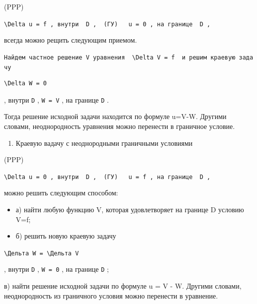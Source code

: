 \documentclass[
  ukrainian,
]{article}
\providecommand{\tightlist}{%
  \setlength{\itemsep}{0pt}\setlength{\parskip}{0pt}}
\begin{document}
(PPP)

\texttt{\textquotesingle{}\textbackslash{}Delta\ u\ =\ f\textquotesingle{}\ ,\ внутри\ \ \textquotesingle{}D\textquotesingle{}\ ,\ \ \textquotesingle{}(ГУ)\textquotesingle{}\ \ \ \textquotesingle{}u\ =\ 0\textquotesingle{}\ ,\ на\ границе\ \ \textquotesingle{}D\textquotesingle{}\ ,}

всегда можно рещить следующим приемом.

\texttt{Найдем\ частное\ решение\ V\ уравнения\ \ \textquotesingle{}\textbackslash{}Delta\ V\ =\ f\textquotesingle{}\ \ и\ решим\ краевую\ задачу}

\begin{verbatim}
\Delta W = 0
\end{verbatim}

, внутри \texttt{D} , \texttt{W\ =\ V} , на границе \texttt{D} .

Тогда решение исходной задачи находится по формуле u=V-W. Другими
словами, неоднородность уравнения можно перенести в граничное условие.

\begin{enumerate}
\def\labelenumi{\arabic{enumi}.}
\setcounter{enumi}{1}
\tightlist
\item
  Краевую вадачу с неоднородными граничными условиями
\end{enumerate}

(PPP)

\texttt{\textquotesingle{}\textbackslash{}Delta\ u\ =\ 0\textquotesingle{}\ ,\ внутри\ \ \textquotesingle{}D\textquotesingle{}\ ,\ \ \textquotesingle{}(ГУ)\textquotesingle{}\ \ \ \textquotesingle{}u\ =\ f\textquotesingle{}\ ,\ на\ границе\ \ \textquotesingle{}D\textquotesingle{}\ ,}

можно решить следующим способом:

\begin{itemize}
\tightlist
\item
  а) найти любую функцию V, которая удовлетворяет на границе D условию
  V=f;
\item
  б) решить новую краевую задачу
\end{itemize}

\texttt{\textbackslash{}Дельта\ W\ =\ \textbackslash{}Дельта\ V}

, внутри \texttt{D} , \texttt{W\ =\ 0} , на границе \texttt{D} ;

в) найти решение исходной задачи по формуле u = V - W. Другими словами,
неоднородность из граничного условия можно перенести в уравнение.
\end{document}
